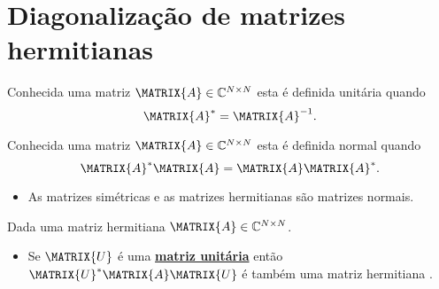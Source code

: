 \section{ Diagonalização de matrizes hermitianas}

\begin{definition}\label{def:unitarymatrix0}
Conhecida uma matriz $\MATRIX{A} \in \mathbb{C}^{N \times N}$
esta é definida unitária quando \cite[pp. 80]{golub2013matrix} 
\begin{equation}
\MATRIX{A}^{\ast} = \MATRIX{A}^{-1}.
\end{equation}
\end{definition}
\begin{definition}\label{def:normalmatrix0}
Conhecida uma matriz $\MATRIX{A} \in \mathbb{C}^{N \times N}$
esta é definida normal quando \cite[pp. 226]{hartfiel2000matrix} 
\begin{equation}
\MATRIX{A}^{\ast} \MATRIX{A}= \MATRIX{A} \MATRIX{A}^{\ast}.
\end{equation}
\end{definition}

\begin{tcbattention}
\begin{itemize}
\item As matrizes simétricas e as matrizes hermitianas são matrizes normais.
\end{itemize}
\end{tcbattention}

\begin{theorem}\label{theo:unitariahermitian0}
Dada uma matriz hermitiana $\MATRIX{A} \in \mathbb{C}^{N \times N}$.
\begin{itemize}
\item Se $\MATRIX{U}$ é uma \hyperref[def:unitarymatrix0]{\textbf{matriz unitária}} 
então $\MATRIX{U}^{\ast} \MATRIX{A} \MATRIX{U}$ 
é também uma matriz hermitiana \cite[pp. 59]{axelsson1996iterative}.
\end{itemize}
\end{theorem}

